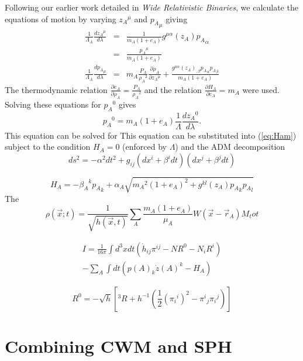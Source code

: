 Following our earlier work detailed in {\it Wide Relativistic Binaries}, we calculate the
equations of motion by varying ${z_A}^{\mu}$ and ${p_A}_{\mu}$ giving
\begin{eqnarray}\label{eq:eqs_of_motion}
\frac{1}{\Lambda_A}\frac{d {z_A}^{\mu}}{d\lambda} & = & \frac{1}{m_A(1+e_A)} g^{\mu\alpha}(z_A){p_A}_{\alpha} \nonumber \\
                    & = & \frac{ {p_A}^{\mu} }{ m_A (1+e_A)} \\
\frac{1}{\Lambda_A}\frac{d {p_A}_{\mu}}{d\lambda} & = & m_A \frac{P_A}{{\rho_A}^2} \frac{\partial \rho_A}{\partial {z_A}^{\mu}}
                    + \frac{g^{\mu\alpha}({z_A})_{,\beta}{p_A}_{\alpha}{p_A}_{\beta}}{m_A (1+e_A)}
\end{eqnarray}
The thermodynamic relation $\frac{\partial e_A}{\partial \rho_A} = \frac{P_A}{ {\rho_A}^2 }$ and
the relation $\frac{\partial H_A}{\partial e_A} = m_A$ were used.
Solving these equations for ${p_A}^{0}$ gives
\begin{equation}\label{eq:p_0_up}
{p_A}^{0} = m_A (1+e_A) \frac{1}{\Lambda} \frac{d {z_A}^{0} }{d \lambda}.
\end{equation}
This equation can be solved for
This equation can be substituted into (\ref{eq:Ham}) subject to the condition $H_A = 0$ (enforced
by $\Lambda$) and the ADM decomposition
\begin{equation}\label{eq:ADM_metric}
ds^2 = -\alpha^2 dt^2 + g_{ij}(dx^i + \beta^i dt) (dx^j + \beta^j dt)
\end{equation}

\begin{equation}\label{eq:ADM_H}
H_A = -{\beta_A}^k {p_A}_k + {\alpha_A} \sqrt{ {m_A}^2 (1+e_A)^2 + g^{kl}(z_A){p_A}_k {p_A}_l }
\end{equation}
The
\begin{equation}
\rho({\vec x};t) = \frac{1}{\sqrt{h({\vec x},t)}} \sum_{A} \frac{m_{A} \left( 1 + e_{A} \right)}{\mu_{A}} W( {\vec x} - {\vec r}_{A}) M_tot
\end{equation}

\begin{eqnarray}
I = \frac{1}{16\pi} \int \!d^3x dt \left( {\dot h}_{ij} \pi^{ij} - N R^0 - N_i R^i \right) \nonumber \\ - \sum_{A} \int \! dt \left( p(A)_k {\dot z(A)}^k - H_A \right)
\end{eqnarray}

\begin{equation}
R^0 = - \sqrt{h} \left[ {}^3R + h^{-1} \left( \frac{1}{2} \left({\pi_{i}}^{i}\right)^{2} - {\pi^{i}}_{j} {\pi_{i}}^{j} \right) \right]
\end{equation}
\section{Combining CWM and SPH}\label{cfmsph}




